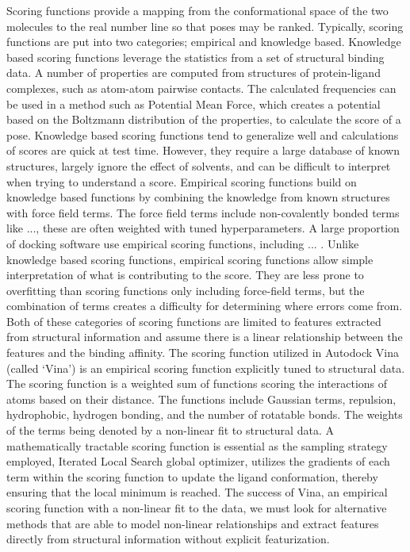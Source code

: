 \documentclass[journal=jcisd8,manuscript=article]{achemso}
\begin{document}
Scoring functions provide a mapping from the conformational space of the two molecules to the real number line so that poses may be ranked. Typically, scoring functions are put into two categories; empirical and knowledge based. Knowledge based scoring functions leverage the statistics from a set of structural binding data. A number of properties are computed from structures of protein-ligand complexes, such as atom-atom pairwise contacts. The calculated frequencies can be used in a method such as Potential Mean Force, which creates a potential based on the Boltzmann distribution of the properties, to calculate the score of a pose. Knowledge based scoring functions tend to generalize well and calculations of scores are quick at test time. However, they require a large database of known structures, largely ignore the effect of solvents, and can be difficult to interpret when trying to understand a score. Empirical scoring functions build on knowledge based functions by combining the knowledge from known structures with force field terms. The force field terms include non-covalently bonded terms like ..., these are often weighted with tuned hyperparameters. A large proportion of docking software use empirical scoring functions, including ... \cite{}. Unlike knowledge based scoring functions, empirical scoring functions allow simple interpretation of what is contributing to the score. They are less prone to overfitting than scoring functions only including force-field terms, but the combination of terms creates a difficulty for determining where errors come from. Both of these categories of scoring functions are limited to features extracted from structural information and assume there is a linear relationship between the features and the binding affinity. The scoring function utilized in Autodock Vina (called `Vina') is an empirical scoring function explicitly tuned to structural data\cite{trott2010autodock}. The scoring function is a weighted sum of functions scoring the interactions of atoms based on their distance. The functions include Gaussian terms, repulsion, hydrophobic, hydrogen bonding, and the number of rotatable bonds. The weights of the terms being denoted by a non-linear fit to structural data. A mathematically tractable scoring function is essential as the sampling strategy employed, Iterated Local Search global optimizer, utilizes the gradients of each term within the scoring function to update the ligand conformation, thereby ensuring that the local minimum is reached. The success of Vina, an empirical scoring function with a non-linear fit to the data, we must look for alternative methods that are able to model non-linear relationships and extract features directly from structural information without explicit featurization.
\end{document}
